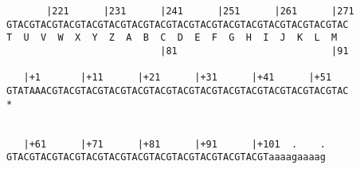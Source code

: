 \documentclass{article}
\begin{document}
\begin{Verbatim}
       |221      |231      |241      |251      |261      |271
GTACGTACGTACGTACGTACGTACGTACGTACGTACGTACGTACGTACGTACGTACGTAC
T  U  V  W  X  Y  Z  A  B  C  D  E  F  G  H  I  J  K  L  M  
                           |81                           |91
  
   |+1       |+11      |+21      |+31      |+41      |+51   
GTATAAACGTACGTACGTACGTACGTACGTACGTACGTACGTACGTACGTACGTACGTAC
*   
                                                            
  
   |+61      |+71      |+81      |+91      |+101  .    .
GTACGTACGTACGTACGTACGTACGTACGTACGTACGTACGTACGTaaaagaaaag
          
                                                        
\end{Verbatim}
\end{document}
